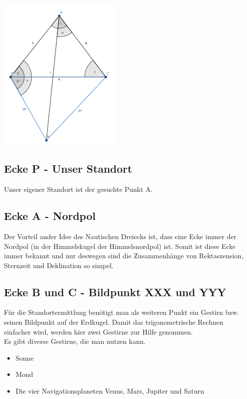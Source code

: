 \documentclass[12pt]{scrartcl}
\begin{document}
	\begin{center}
		\includegraphics[width=6cm]{Bilder/dreieck.png}
	\end{center}	



\subsection{Ecke P - Unser Standort}
Unser eigener Standort ist der gesuchte Punkt A. 

\subsection{Ecke A - Nordpol}
Der Vorteil ander Idee des Nautischen Dreiecks ist, dass eine Ecke immer der Nordpol (in der Himmelskugel der Himmelsnordpol) ist. 
Somit ist diese Ecke immer bekannt und nur deswegen sind die Zusammenhänge von Rektaszension, Sternzeit und Deklination so simpel.

\subsection{Ecke B und C - Bildpunkt XXX und YYY}
Für die Standortermittlung benötigt man als weiteren Punkt ein Gestirn bzw. seinen Bildpunkt auf der Erdkugel. 
Damit das trigonometrische Rechnen einfacher wird, werden hier zwei Gestirne zur Hilfe genommen.
\\
Es gibt diverse Gestirne, die man nutzen kann.
\begin{itemize}
	\item Sonne
	\item Mond
	\item Die vier Navigationsplaneten Venus, Mars, Jupiter und Saturn
\end{itemize} 
\end{document}
